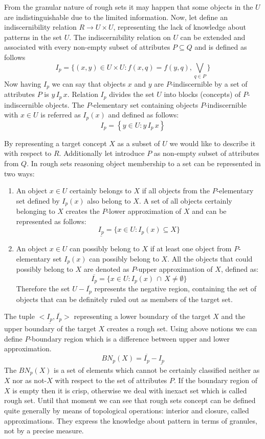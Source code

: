 From the granular nature of rough sets it may happen that some objects 
in the $U$ are indistinguishable due to the limited information. Now, let
define an indiscernibility relation $R \rightarrow U \times U$, representing the 
lack of knowledge about patterns in the set $U$. The indiscernibility relation on
$U$ can be extended and associated with every non-empty subset of attributes $P \subseteq Q$
and is defined as follows 
$$I_p = \{ (x, y) \in U \times U: f(x, q) = f(y,q), \bigvee_{q \in P}\}$$ 
Now having $I_p$ we can say that objects $x$ and
$y$ are $P$-indiscernible by a set of attributes $P$ is $y \, I_p \, x$. Relation
$I_p$ divides the set $U$ into blocks (concepts) of $P$-indiscernible objects.
The $P$-elementary set containing objects $P$-indiscernible with $x \in U$ is
referred as $I_p(x)$ and defined as follows:
$$I_p = \left\{ y \in U: y \, I_p \, x \right\}$$

By representing a target concept $X$ as a subset of $U$ we would like to
describe it with respect to $R$. Additionally let introduce $P$ as non-empty
subset of attributes from $Q$. In rough sets reasoning object membership to a
set can be represented in two ways:
\begin{enumerate}
    \item An object $x \in U$ certainly belongs to $X$ if
        all objects from the $P$-elementary set defined by $I_p(x)$ also belong to $X$.
        A set of all objects certainly belonging to $X$ creates the $P$-lower
        approximation of $X$ and can be represented as follows:
            $$\underline{I_p} = \{ x \in U: I_p(x) \subseteq X\}$$
    \item An object $x \in U$ can possibly belong to $X$ if at least one object
        from $P$-elementary set $I_p(x)$ can possibly belong to $X$. All the
        objects that could possibly belong to $X$ are denoted as $P$-upper
        approximation of $X$, defined as:
        $$\overline{I_p} = \{x\in U: I_p(x) \, \cap \, X \neq \emptyset \}$$
        Therefore the set $U - \overline{I_p}$ represents the negative region,
        containing the set of objects that can be definitely ruled out as
        members of the target set.
\end{enumerate}
The tuple $<\underline{I_p}, \overline{I_p}>$ representing a lower boundary of
the target $X$ and the upper boundary of the target $X$ creates a rough set.
Using above notions we can define $P$-boundary region which is a difference
between upper and lower approximation. 
$$BN_p(X) = \overline{I_p} - \underline{I_p}$$
The $BN_p(X)$ is a set of elements which cannot be certainly classified neither
as $X$ nor as not-$X$ with respect to the set of attributes $P$. If the
boundary region of $X$ is empty then it is crisp, otherwise we deal with
inexact set which is called rough set. Until that moment we can see that 
rough sets concept can be defined quite generally by means of topological
operations: interior and closure, called approximations. They express the
knowledge about pattern in terms of granules, not by a precise measure.

